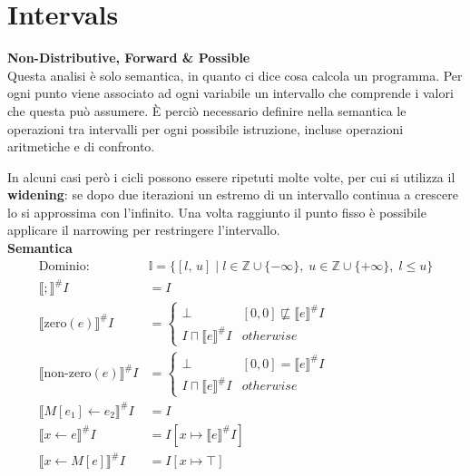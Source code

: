 \documentclass[a4paper,12pt,openany]{article}
\begin{document}
    
    \clearpage\section*{Intervals}
    \textbf{Non-Distributive, Forward \& Possible}\\[1em]
    Questa analisi è solo semantica, in quanto ci dice cosa calcola un programma. Per ogni punto viene associato ad ogni variabile un intervallo che comprende i valori che questa può assumere. È perciò necessario definire nella semantica le operazioni tra intervalli per ogni possibile istruzione, incluse operazioni aritmetiche e di confronto.
    
    In alcuni casi però i cicli possono essere ripetuti molte volte, per cui si utilizza il \textbf{widening}: se dopo due iterazioni un estremo di un intervallo continua a crescere lo si approssima con l'infinito. Una volta raggiunto il punto fisso è possibile applicare il narrowing per restringere l'intervallo.\\[1em]

    \textbf{Semantica}
    \begin{align*}
    \mbox{Dominio: }& \mathbb{I}=\{[l,\,u]\;\big\vert\; l\in\mathbb{Z}\cup\{-\infty\},\; u\in\mathbb{Z}\cup\{+\infty\},\; l\leq u\}\\
    \llbracket ; \rrbracket^\#I &= I\\
    \llbracket \mbox{zero}(e) \rrbracket^\#I &= 
    \begin{cases}
        \bot & [0, 0] \not\sqsubseteq \llbracket e \rrbracket^\#I\\
        I\sqcap\llbracket e \rrbracket^\#I & otherwise
    \end{cases}\\
    \llbracket \mbox{non-zero}(e) \rrbracket^\#I &= 
    \begin{cases}
        \bot & [0, 0] = \llbracket e \rrbracket^\#I\\
        I\sqcap\llbracket e \rrbracket^\#I & otherwise
    \end{cases}\\
    \llbracket M[e_1]\leftarrow e_2 \rrbracket^\#I &= I\\
    \llbracket x \leftarrow e \rrbracket^\#I &= I[x\mapsto\llbracket e \rrbracket^\#I]\\
    \llbracket x \leftarrow M[e] \rrbracket^\#I &= I[x\mapsto\top]
    \end{align*}
    
\end{document}
